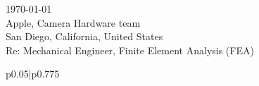 \documentclass[12pt]{article} %
\begin{document}
\begin{paracol}{2} %


\parbox[top][0.1\textheight][c]{\linewidth}{ %
	\vspace{0.0\textheight} %
	\today\\[6pt]
	Apple, Camera Hardware team\\
	San Diego, California, United States\\
	Re: Mechanical Engineer, Finite Element Analysis (FEA)\\[6pt] \medskip
}


\switchcolumn %


\parbox[top][0.1\textheight][c]{\linewidth}{ %
	\vspace{0\textheight} %
	\colorbox{shade}{ %
		\begin{supertabular}{p{0.05\linewidth}|p{0.775\linewidth}} %
			\ifthenelse{\equal{\cvdate}{}}{}{\raisebox{-1pt}{\faInfo} & \cvdate \\}
			\ifthenelse{\equal{\cvaddress}{}}{}{\raisebox{-1pt}{\faHome} & \cvaddress \\} %
			\ifthenelse{\equal{\cvaddress}{}}{}{\raisebox{-1pt}{\faPhone} & \cvnumberphone \\} %
		\end{supertabular}
	}
}


\end{paracol}
\end{document}
